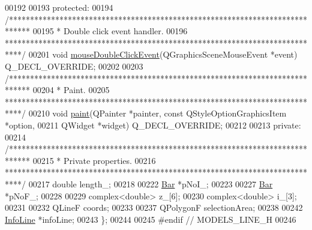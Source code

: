 \begin{DoxyCode}
00192 
00193 protected:
00194   \textcolor{comment}{/*****************************************************************************}
00195 \textcolor{comment}{   * Double click event handler.}
00196 \textcolor{comment}{   ****************************************************************************/}
00201   \textcolor{keywordtype}{void} \hyperlink{group___models_ga9a1fee5b1606ab0deedd04bdab99be70}{mouseDoubleClickEvent}(QGraphicsSceneMouseEvent *event) Q\_DECL\_OVERRIDE;
00202 
00203   \textcolor{comment}{/*****************************************************************************}
00204 \textcolor{comment}{   * Paint.}
00205 \textcolor{comment}{   ****************************************************************************/}
00210   \textcolor{keywordtype}{void} \hyperlink{group___models_ga0aa64aed379d434be5942edf572b444b}{paint}(QPainter *painter, const QStyleOptionGraphicsItem *option,
00211              QWidget *widget) Q\_DECL\_OVERRIDE;
00212 
00213 private:
00214   \textcolor{comment}{/*****************************************************************************}
00215 \textcolor{comment}{   * Private properties.}
00216 \textcolor{comment}{   ****************************************************************************/}
00217   \textcolor{keywordtype}{double} length\_;
00218 
00222   \hyperlink{class_bar}{Bar} *pNoI\_;
00223 
00227   \hyperlink{class_bar}{Bar} *pNoF\_;
00228 
00229   complex<\textcolor{keywordtype}{double}> z\_[6];
00230   complex<\textcolor{keywordtype}{double}> i\_[3];
00231 
00232   QLineF coords;
00233 
00237   QPolygonF selectionArea;
00238 
00242   \hyperlink{class_info_line}{InfoLine} *infoLine;
00243 \};
00244 
00245 \textcolor{preprocessor}{#endif  // MODELS\_LINE\_H}
00246 
\end{DoxyCode}
